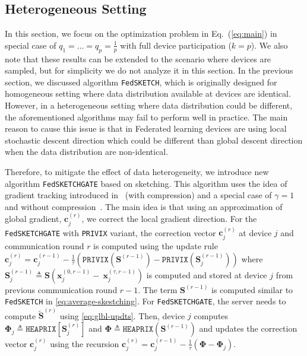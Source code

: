 \documentclass[twoside]{article}
\begin{document}
\subsection{Heterogeneous Setting}
In this section, we focus on the optimization problem in Eq.~(\ref{eq:main}) in special case of $q_1=\ldots=q_p=\frac{1}{p}$ with full device participation ($k=p$). We also note that these results can be extended to the scenario where devices are sampled, but for simplicity we do not analyze it in this section. In the previous section, we discussed algorithm \texttt{FedSKETCH}, which is originally designed for homogeneous setting where data distribution available at devices are identical. However, in a heterogeneous setting where data distribution could be different, the aforementioned algorithms may fail to perform well in practice. The main reason to cause this issue is that in Federated learning devices are using local stochastic descent direction which could be different than global descent direction when the data distribution are non-identical. 

Therefore, to mitigate the effect of data heterogeneity, we introduce new algorithm \texttt{FedSKETCHGATE} based on sketching. This algorithm uses the idea of gradient tracking introduced in~\cite{haddadpour2020federated} (with compression) and a special case of $\gamma=1$ and without compression~\cite{liang2019variance}. The main idea is that using an approximation of global gradient, $\mathbf{c}_j^{(r)}$, we correct the local gradient direction. For the \texttt{FedSKETCHGATE} with \texttt{PRIVIX} variant, the correction vector $\mathbf{c}_j^{(r)}$ at device $j$ and communication round $r$ is computed using the update rule $\mathbf{c}_j^{(r)}=\mathbf{c}_j^{(r-1)}-\frac{1}{\tau}\left({\texttt{PRIVIX}}\left(\mathbf{S}^{(r-1)}\right)-{\texttt{PRIVIX}}\left(\mathbf{S}^{(r-1)}_{j}\right)\right)$ where $\mathbf{S}^{(r-1)}_{j}\triangleq\mathbf{S}\left(\boldsymbol{x}_j^{(0,r-1)}-~{\boldsymbol{x}}_{j}^{(\tau,r-1)}\right)$ is computed and stored at device $j$ from previous communication round $r-1$. The term $\mathbf{S}^{(r-1)}$ is computed similar to \texttt{FedSKETCH} in \eqref{eq:average-skestching}. 
For \texttt{FedSKETCHGATE}, the server needs to compute $\tilde{\mathbf{S}}^{(r)}$ using \eqref{eq:glbl-updts}. 
Then, device $j$ computes $\mathbf{\Phi}_j\triangleq \texttt{HEAPRIX}[\mathbf{S}_j^{(r)}]$ and $  {\mathbf{\Phi}}\triangleq \texttt{HEAPRIX}(\mathbf{S}^{(r-1)})$ and updates the correction vector $\mathbf{c}_j^{(r)}$ using the recursion $\mathbf{c}_j^{(r)}=\mathbf{c}_j^{(r-1)}-\frac{1}{\tau}\left(\mathbf{\Phi}-\mathbf{\Phi}_j\right)$.
\end{document}
